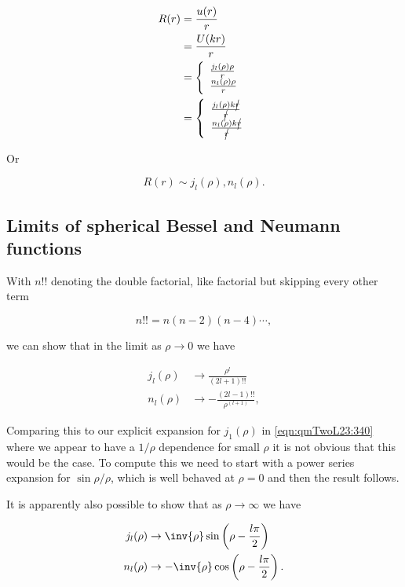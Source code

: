\begin{align*}
R(r) 
&= \frac{u(r)}{r}  \\
&= \frac{U(kr)}{r}  \\
&= 
\left\{
\begin{array}{l}
\frac{j_l(\rho) \rho}{r} \\
\frac{n_l(\rho) \rho}{r} 
\end{array}
\right. \\
&= 
\left\{
\begin{array}{l}
\frac{j_l(\rho) k \cancel{r}}{\cancel{r}} \\
\frac{n_l(\rho) k \cancel{r}}{\cancel{r}} 
\end{array}
\right. 
\end{align*}

Or 

\begin{equation}\label{eqn:qmTwoL23:360}
R(r) \sim j_l(\rho), n_l(\rho).
\end{equation}

\subsection{Limits of spherical Bessel and Neumann functions}

With $n!!$ denoting the double factorial, like factorial but skipping every other term

\begin{equation}\label{eqn:qmTwoL23:400}
n!! = n(n-2)(n-4) \cdots,
\end{equation}

we can show that in the limit as $\rho \rightarrow 0$ we have

\begin{align}\label{eqn:qmTwoL23:380}
j_l(\rho) &\rightarrow \frac{\rho^l}{(2 l + 1)!!} \\
n_l(\rho) &\rightarrow -\frac{(2 l - 1)!!}{\rho^{(l+1)}},
\end{align}

Comparing this to our explicit expansion for $j_1(\rho)$ in \ref{eqn:qmTwoL23:340} where we appear to have a $1/\rho$ dependence for small $\rho$ it is not obvious that this would be the case.  To compute this we need to start with a power series expansion for $\sin\rho/\rho$, which is well behaved at $\rho =0$ and then the result follows.

It is apparently also possible to show that as $\rho \rightarrow \infty$ we have

\begin{align}\label{eqn:qmTwoL23:420}
j_l(\rho) &\rightarrow \inv{\rho} \sin\left( \rho - \frac{l \pi}{2} \right) \\
n_l(\rho) &\rightarrow -\inv{\rho} \cos\left( \rho - \frac{l \pi}{2} \right) .
\end{align}

